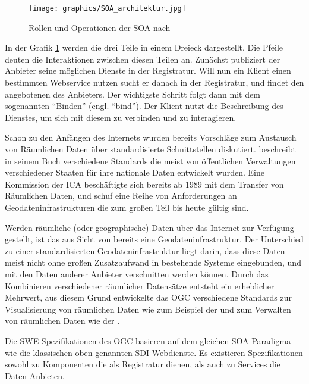 \begin{figure}[H]
	\centering
 	 \texttt{[image: graphics/SOA\_architektur.jpg]} 
	\caption{Rollen und Operationen der \gls{SOA} nach \cite{papazoglou_web_2008}}
	 \label{fig:SOA_architektur}
\end{figure}

In der Grafik \ref{fig:SOA_architektur} werden die drei Teile in einem Dreieck dargestellt. Die Pfeile deuten die Interaktionen zwischen diesen Teilen an. Zunächst publiziert der Anbieter seine möglichen Dienste in der Registratur. Will nun ein Klient einen bestimmten Webservice nutzen sucht er danach in der Registratur, und findet den angebotenen des Anbieters. Der wichtigste Schritt folgt dann mit dem sogenannten ``Binden'' (engl. ``bind''). Der Klient nutzt die Beschreibung des Dienstes, um sich mit diesem zu verbinden und zu interagieren.

Schon zu den Anfängen des Internets wurden bereits Vorschläge zum Austausch von Räumlichen Daten über standardisierte Schnittstellen diskutiert. \citep{moellering_spatial_1997} beschreibt in seinem Buch verschiedene Standards die meist von öffentlichen Verwaltungen verschiedener Staaten für ihre nationale Daten entwickelt wurden. Eine Kommission der \gls{ICA} beschäftigte sich bereits ab 1989 mit dem Transfer von Räumlichen Daten, und schuf eine Reihe von Anforderungen an Geodateninfrastrukturen die zum großen Teil bis heute gültig sind. 

Werden räumliche (oder geographische) Daten über das Internet zur Verfügung gestellt, ist das aus Sicht von \citep{aalders_spatial_2001} bereits eine Geodateninfrastruktur. Der Unterschied zu einer standardisierten Geodateninfrastruktur liegt darin, dass diese Daten meist nicht ohne großen Zusatzaufwand in bestehende Systeme eingebunden, und mit den Daten anderer Anbieter verschnitten werden können. Durch das Kombinieren verschiedener räumlicher Datensätze entsteht ein erheblicher Mehrwert, aus diesem Grund entwickelte das \gls{OGC} verschiedene Standards zur Visualisierung von räumlichen Daten wie zum Beispiel der  und zum Verwalten von räumlichen Daten wie der .

Die \gls{SWE} Spezifikationen des \gls{OGC} basieren auf dem gleichen \gls{SOA} Paradigma wie die klassischen oben genannten \gls{SDI} Webdienste. Es existieren Spezifikationen sowohl zu Komponenten die als Registratur dienen, als auch zu Services die Daten Anbieten.


